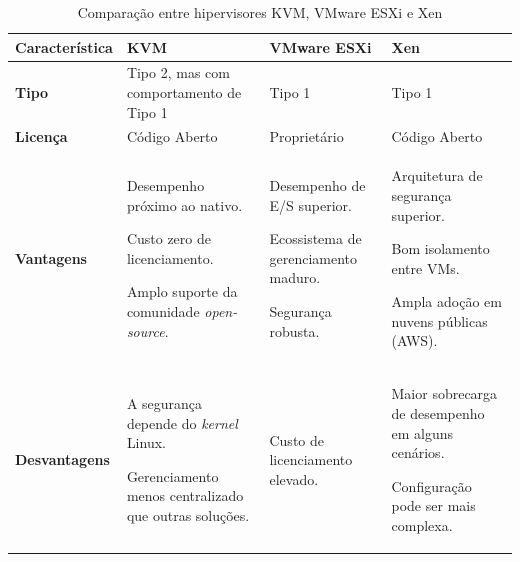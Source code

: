 \begin{table}[htb]
    \centering
    \renewcommand{\arraystretch}{1.3}
    \caption{Comparação entre hipervisores KVM, VMware ESXi e Xen}
    \label{tab:hipervisores}
    \begin{tabularx}{\textwidth}{| >{\raggedright\arraybackslash}p{3cm} | X | X | X |}
        \hline
        \textbf{Característica} & \textbf{KVM} & \textbf{VMware ESXi} & \textbf{Xen} \\ \hline
        \textbf{Tipo} & Tipo 2, mas com comportamento de Tipo 1 & Tipo 1 & Tipo 1 \\ \hline
        \textbf{Licença} & Código Aberto & Proprietário & Código Aberto \\ \hline
        \textbf{Vantagens} &
        \begin{description}
            \item Desempenho próximo ao nativo.
            \item Custo zero de licenciamento.
            \item Amplo suporte da comunidade \textit{open-source}.
        \end{description} &
        \begin{description}
            \item Desempenho de E/S superior.
            \item Ecossistema de gerenciamento maduro.
            \item Segurança robusta.
        \end{description} &
        \begin{description}
            \item Arquitetura de segurança superior.
            \item Bom isolamento entre VMs.
            \item Ampla adoção em nuvens públicas (AWS).
        \end{description} \\ \hline
        \textbf{Desvantagens} &
        \begin{description}
            \item A segurança depende do \textit{kernel} Linux.
            \item Gerenciamento menos centralizado que outras soluções.
        \end{description} &
        \begin{description}
            \item Custo de licenciamento elevado.
        \end{description} &
        \begin{description}
            \item Maior sobrecarga de desempenho em alguns cenários.
            \item Configuração pode ser mais complexa.
        \end{description} \\ \hline
    \end{tabularx}
\end{table}

